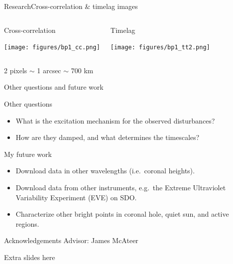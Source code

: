 \documentclass[11pt,table]{beamer}
\begin{document}
\begin{frame}[t]{Research}{Cross-correlation \& timelag images}
\vspace{0.25in}
    \begin{columns}
        \begin{block}{\centering Cross-correlation}
            \begin{center}
                \vspace{-0.25in}
                \texttt{[image: figures/bp1\_cc.png]}
            \end{center}
        \end{block}
        \begin{block}{\centering Timelag}
            \begin{center}
                \vspace{-0.25in}
                \texttt{[image: figures/bp1\_tt2.png]}
            \end{center}
        \end{block}
    \end{columns}
    \begin{center}
        2 pixels $\sim$ 1 arcsec $\sim$ 700 km
    \end{center}
\end{frame}%
\begin{frame}{Other questions and future work}
    \begin{block}{Other questions}
        \begin{itemize}
            \item What is the excitation mechanism for the observed
                disturbances?
            \item How are they damped, and what determines the timescales?
        \end{itemize}
    \end{block}
    \begin{block}{My future work}
        \begin{itemize}
            \item Download data in other wavelengths (i.e.\ coronal heights).
            \item Download data from other instruments,
                e.g.\ the Extreme Ultraviolet Variability Experiment
                (EVE) on SDO\@.
            \item Characterize other bright points in coronal hole,
                quiet sun, and active regions.
        \end{itemize}
    \end{block}
\end{frame}%
\begin{frame}{Acknowledgements}
    Advisor: James McAteer
\end{frame}%

\begin{frame}{Extra slides here}
\end{frame}
\end{document}
